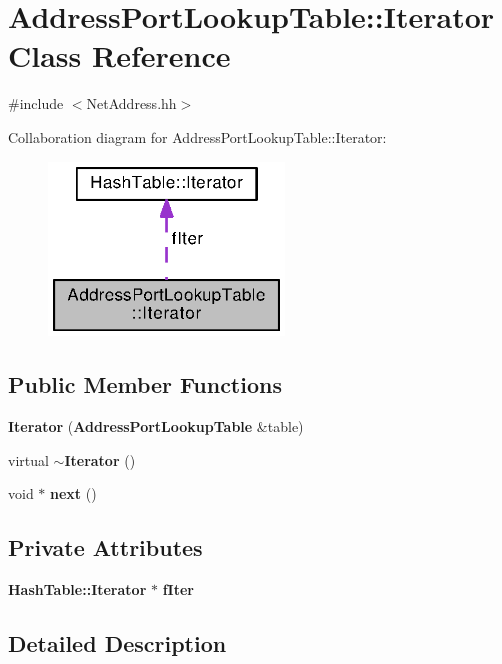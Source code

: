 \section{Address\+Port\+Lookup\+Table\+:\+:Iterator Class Reference}
\label{classAddressPortLookupTable_1_1Iterator}


{\ttfamily \#include $<$Net\+Address.\+hh$>$}



Collaboration diagram for Address\+Port\+Lookup\+Table\+:\+:Iterator\+:
\nopagebreak
\begin{figure}[H]
\begin{center}
\leavevmode
\includegraphics[width=178pt]{classAddressPortLookupTable_1_1Iterator__coll__graph}
\end{center}
\end{figure}
\subsection*{Public Member Functions}
\begin{DoxyCompactItemize}
\item 
{\bf Iterator} ({\bf Address\+Port\+Lookup\+Table} \&table)
\item 
virtual {\bf $\sim$\+Iterator} ()
\item 
void $\ast$ {\bf next} ()
\end{DoxyCompactItemize}
\subsection*{Private Attributes}
\begin{DoxyCompactItemize}
\item 
{\bf Hash\+Table\+::\+Iterator} $\ast$ {\bf f\+Iter}
\end{DoxyCompactItemize}


\subsection{Detailed Description}


